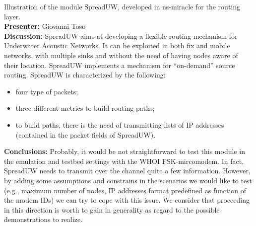 \documentclass[11pt,journal,draftclsnofoot,onecolumn,twoside,letterpaper]{IEEEtran}
\theoremstyle{definition} \newtheorem{definition}[]{Definition}
\theoremstyle{theorem} \newtheorem{theorem}[]{Theorem}
\begin{document}
\vspace{0.5cm}

 Illustration of the module SpreadUW, developed in ns-miracle for the routing layer.\\
{\bf Presenter:} Giovanni Toso\\
{\bf Discussion:} SpreadUW aims at developing a flexible routing mechanism for Underwater Acoustic Networks. It can be exploited in both fix and mobile networks, with multiple sinks and without the need of having nodes aware of their location. SpreadUW implements a mechanism for ``on-demand'' source routing. SpreadUW is characterized by the following: 
\begin{itemize}
 \item four type of packets;
 \item three different metrics to build routing paths;
 \item to build paths, there is the need of transmitting lists of IP addresses (contained in the packet fields of SpreadUW). 
\end{itemize}
{\bf Conclusions:}
Probably, it would be not straightforward to test this module in the emulation and testbed settings with the WHOI FSK-mircomodem. In fact, SpreadUW needs to transmit over the channel quite a few information. However, by adding some assumptions and constrains in the scenarios we would like to test (e.g., maximum number of nodes, IP addresses format predefined as function of the modem IDs) we can try to cope with this issue. We consider that proceeding in this direction is worth to gain in generality as regard to the possible demonstrations to realize.  

\vspace{0.5cm}
\end{document}
